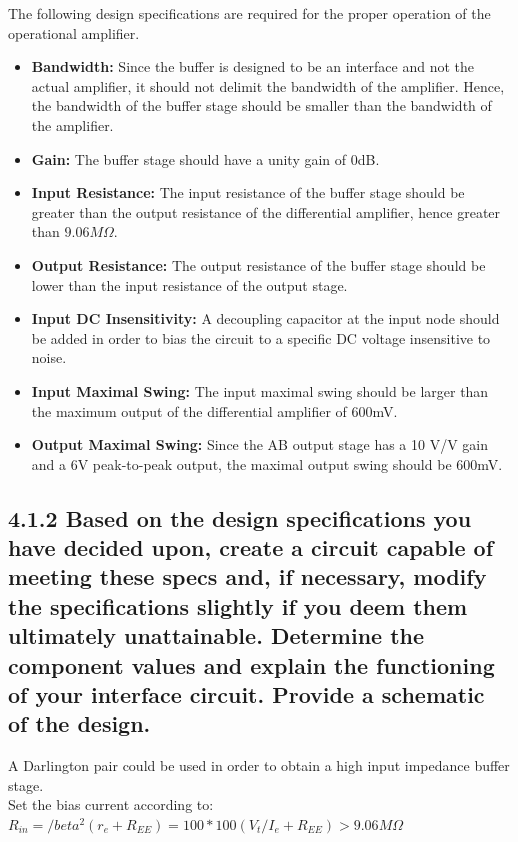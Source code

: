 \documentclass[12pt]{article}
\begin{document}
The following design specifications are required for the proper operation of the operational amplifier.


\begin{itemize}
    \item \textbf{Bandwidth:} Since the buffer is designed to be an interface and not the actual amplifier, it should not delimit the bandwidth of the amplifier. 
    Hence, the bandwidth of the buffer stage should be smaller than the bandwidth of the amplifier. 
    \item \textbf{Gain:} The buffer stage should have a unity gain of 0dB.
    \item \textbf{Input Resistance:} The input resistance of the buffer stage should be greater than the output resistance of the differential amplifier, hence greater than $9.06M \Omega$.
    \item \textbf{Output Resistance:} The output resistance of the buffer stage should be lower than the input resistance of the output stage.
    \item \textbf{Input DC Insensitivity:} A decoupling capacitor at the input node should be added in order to bias the circuit to a specific DC voltage insensitive to noise.
    \item \textbf{Input Maximal Swing:} The input maximal swing should be larger than the maximum output of the differential amplifier of 600mV.
    \item \textbf{Output Maximal Swing:} Since the AB output stage has a 10 V/V gain and a 6V peak-to-peak output, the maximal output swing should be 600mV.
\end{itemize}

\subsection*{4.1.2 Based on the design specifications you have decided upon, create a circuit 
capable of meeting these specs and, if necessary, modify the specifications slightly if you deem 
them ultimately unattainable. Determine the component values and explain the functioning of your 
interface circuit. Provide a schematic of the design. }

A Darlington pair could be used in order to obtain a high input impedance buffer stage. \\

Set the bias current according to: \\

$R_{in} = /beta^2 (r_e + R_{EE}) = 100 * 100 (V_t / I_e + R_{EE}) > 9.06M \Omega$ \\ 
\end{document}
